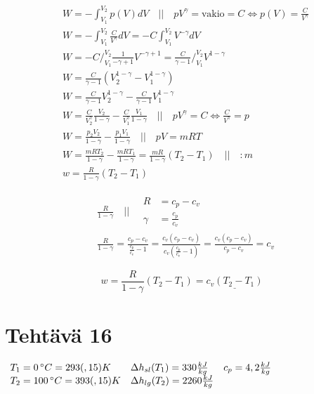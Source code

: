 \documentclass[12pt,a4paper,finnish]{article}
\begin{document}
\begin{align}
 &W = -\int_{V_1}^{V_2} p(V)dV \quad\bigg|\bigg|\quad pV^\gamma = \text{vakio} = C \Leftrightarrow p(V) = \frac{C}{V^\gamma}\\
 &W = -\int_{V_1}^{V_2} \frac{C}{V^\gamma}dV = -C\int_{V_1}^{V_2}V^{-\gamma}dV\\
 &W = -C\bigg/_{V_1}^{V_2}\frac{1}{-\gamma + 1}V^{-\gamma + 1} = \frac{C}{\gamma - 1}\bigg/_{V_1}^{V_2}V^{1 -\gamma}\\
 &W = \frac{C}{\gamma - 1}\left(V_2^{1-\gamma} - V_1^{1-\gamma}\right)\\
 &W = \frac{C}{\gamma - 1}V_2^{1-\gamma} - \frac{C}{\gamma - 1}V_1^{1-\gamma}\\
 &W = \frac{C}{V_2^{\gamma}}\frac{V_2}{1-\gamma} - \frac{C}{V_1^{\gamma}}\frac{V_1}{1-\gamma} \quad \bigg|\bigg| \quad 
  pV^\gamma = C \Leftrightarrow \frac{C}{V^\gamma} = p\\
 &W = \frac{p_2V_2}{1-\gamma} - \frac{p_1V_1}{1-\gamma} \quad \bigg|\bigg| \quad pV = mRT\\
 & W = \frac{mRT_2}{1-\gamma} - \frac{mRT_1}{1-\gamma} = \frac{mR}{1-\gamma}(T_2 - T_1) \quad \bigg|\bigg| \quad :m\\
 &w = \frac{R}{1-\gamma}(T_2 - T_1)
\end{align}

\begin{align}
 &\frac{R}{1-\gamma} \quad \bigg|\bigg| \quad 
 \begin{aligned}
  R &= c_p - c_v\\
  \gamma &= \frac{c_p}{c_v}
 \end{aligned}\\
 &\frac{R}{1-\gamma} = \frac{c_p - c_v}{\frac{c_p}{c_v} - 1} = \frac{c_v(c_p - c_v)}{c_v\left(\frac{c_p}{c_v} - 1\right)}
  = \frac{c_v(c_p - c_v)}{c_p - c_v} = c_v
\end{align}

\begin{equation}
 w = \frac{R}{1-\gamma}(T_2 - T_1) = \underline{c_v(T_2 - T_1)}
\end{equation}

\section{Tehtävä 16}

\begin{math}
 \begin{array}{l l l}
  T_1 = 0\,^\circ C = 293(,15)K & \Delta h_{sl}(T_1) = 330 \frac{kJ}{kg} & c_p = 4,2\frac{kJ}{kg}\\
  T_2 = 100\,^\circ C = 393(,15)K & \Delta h_{lg}(T_2) = 2260 \frac{kJ}{kg} &
 \end{array}
\end{math}
\end{document}
